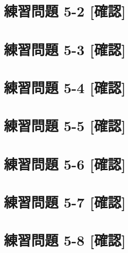 \documentclass[
]{book}
\begin{document}
\hypertarget{ux7df4ux7fd2ux554fux984c-5-2-ux78baux8a8d}{%
\section*{練習問題 5-2 {[}確認{]}}\label{ux7df4ux7fd2ux554fux984c-5-2-ux78baux8a8d}}

\hypertarget{ux7df4ux7fd2ux554fux984c-5-3-ux78baux8a8d}{%
\section*{練習問題 5-3 {[}確認{]}}\label{ux7df4ux7fd2ux554fux984c-5-3-ux78baux8a8d}}

\hypertarget{ux7df4ux7fd2ux554fux984c-5-4-ux78baux8a8d}{%
\section*{練習問題 5-4 {[}確認{]}}\label{ux7df4ux7fd2ux554fux984c-5-4-ux78baux8a8d}}

\hypertarget{ux7df4ux7fd2ux554fux984c-5-5-ux78baux8a8d}{%
\section*{練習問題 5-5 {[}確認{]}}\label{ux7df4ux7fd2ux554fux984c-5-5-ux78baux8a8d}}

\hypertarget{ux7df4ux7fd2ux554fux984c-5-6-ux78baux8a8d}{%
\section*{練習問題 5-6 {[}確認{]}}\label{ux7df4ux7fd2ux554fux984c-5-6-ux78baux8a8d}}

\hypertarget{ux7df4ux7fd2ux554fux984c-5-7-ux78baux8a8d}{%
\section*{練習問題 5-7 {[}確認{]}}\label{ux7df4ux7fd2ux554fux984c-5-7-ux78baux8a8d}}

\hypertarget{ux7df4ux7fd2ux554fux984c-5-8-ux78baux8a8d}{%
\section*{練習問題 5-8 {[}確認{]}}\label{ux7df4ux7fd2ux554fux984c-5-8-ux78baux8a8d}}
\end{document}
